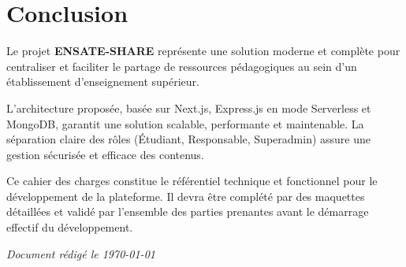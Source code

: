 \documentclass[12pt,a4paper]{article}
\begin{document}
\section{Conclusion}

Le projet \textbf{ENSATE-SHARE} représente une solution moderne et complète pour centraliser et faciliter le partage de ressources pédagogiques au sein d'un établissement d'enseignement supérieur. 

L'architecture proposée, basée sur Next.js, Express.js en mode Serverless et MongoDB, garantit une solution scalable, performante et maintenable. La séparation claire des rôles (Étudiant, Responsable, Superadmin) assure une gestion sécurisée et efficace des contenus.

Ce cahier des charges constitue le référentiel technique et fonctionnel pour le développement de la plateforme. Il devra être complété par des maquettes détaillées et validé par l'ensemble des parties prenantes avant le démarrage effectif du développement.

\vspace{1cm}

\begin{center}
\textit{Document rédigé le \today}
\end{center}
\end{document}
